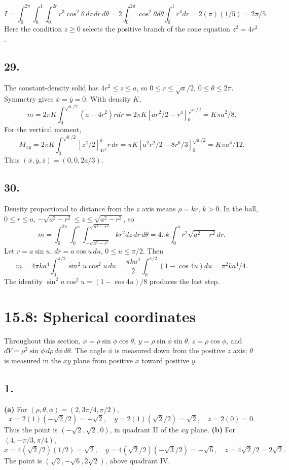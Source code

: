 \documentclass[11pt]{article}
\newcommand{\ex}[1]{\subsection*{#1.}}
\newcommand{\ans}[1]{\boxed{#1}}
\begin{document}
\[I=\int_0^{2\pi}\int_0^1\int_0^{2r}r^3\cos^2\theta\,dz\,dr\,d\theta
=2\int_0^{2\pi}\cos^2\theta d\theta\int_0^1r^4dr=2(\pi)(1/5)=\ans{2\pi/5}.\]
Here the condition $z\ge0$ selects the positive branch of the cone equation $z^2=4r^2$.
\ex{29}
The constant-density solid has $4r^2\le z\le a$, so $0\le r\le\sqrt a/2$, $0\le\theta\le2\pi$. Symmetry gives $\bar x=\bar y=0$. With density $K$,
\[m=2\pi K\int_0^{\sqrt a/2}(a-4r^2)rdr
=2\pi K[ar^2/2-r^4]_0^{\sqrt a/2}=\ans{K\pi a^2/8}.\]
For the vertical moment,
\[M_{xy}=2\pi K\int_0^{\sqrt a/2}[z^2/2]_{4r^2}^a r\,dr
=\pi K[a^2r^2/2-8r^6/3]_0^{\sqrt a/2}=K\pi a^3/12.\]
Thus $\ans{(\bar x,\bar y,\bar z)=(0,0,2a/3)}$.
\ex{30}
Density proportional to distance from the $z$ axis means $\rho=kr$, $k>0$. In the ball, $0\le r\le a$, $-\sqrt{a^2-r^2}\le z\le\sqrt{a^2-r^2}$, so
\[m=\int_0^{2\pi}\int_0^a\int_{-\sqrt{a^2-r^2}}^{\sqrt{a^2-r^2}}kr^2dz\,dr\,d\theta
=4\pi k\int_0^ar^2\sqrt{a^2-r^2}dr.\]
Let $r=a\sin u$, $dr=a\cos u\,du$, $0\le u\le\pi/2$. Then
\[m=4\pi ka^4\int_0^{\pi/2}\sin^2u\cos^2u\,du
=\frac{\pi ka^4}{2}\int_0^{\pi/2}(1-\cos4u)du=\ans{\pi^2ka^4/4}.\]
The identity $\sin^2u\cos^2u=(1-\cos4u)/8$ produces the last step.
\clearpage\section*{15.8: Spherical coordinates}
Throughout this section, $x=\rho\sin\phi\cos\theta$, $y=\rho\sin\phi\sin\theta$, $z=\rho\cos\phi$, and $dV=\rho^2\sin\phi\,d\rho\,d\phi\,d\theta$. The angle $\phi$ is measured down from the positive $z$ axis; $\theta$ is measured in the $xy$ plane from positive $x$ toward positive $y$.
\ex{1}
\textbf{(a)} For $(\rho,\theta,\phi)=(2,3\pi/4,\pi/2)$,
\[x=2(1)(-\sqrt2/2)=-\sqrt2,\quad y=2(1)(\sqrt2/2)=\sqrt2,\quad z=2(0)=0.\]
Thus the point is $\ans{(-\sqrt2,\sqrt2,0)}$, in quadrant II of the $xy$ plane.
\textbf{(b)} For $(4,-\pi/3,\pi/4)$,
\[x=4(\sqrt2/2)(1/2)=\sqrt2,\quad y=4(\sqrt2/2)(-\sqrt3/2)=-\sqrt6,\quad z=4\sqrt2/2=2\sqrt2.\]
The point is $\ans{(\sqrt2,-\sqrt6,2\sqrt2)}$, above quadrant IV.
\begin{center}\end{center}
\end{document}
